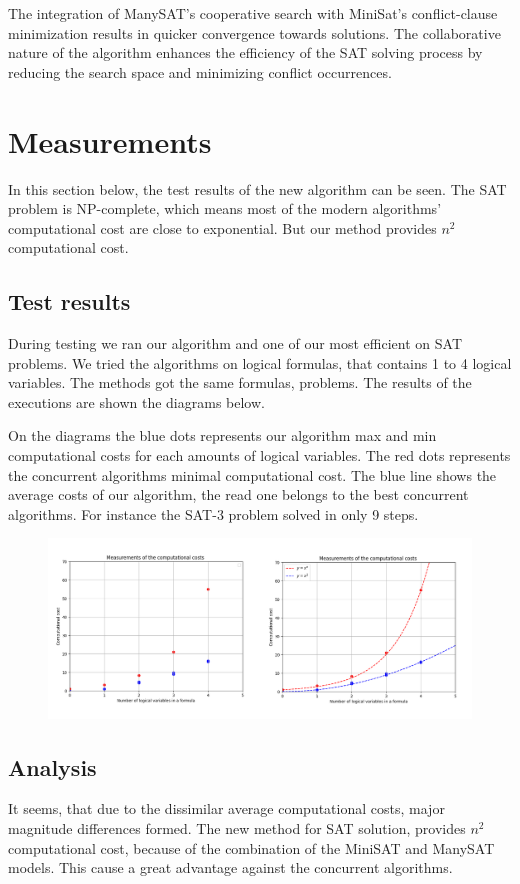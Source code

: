 \documentclass{article}
\begin{document}
The integration of ManySAT’s cooperative search with MiniSat’s conflict-clause minimization results in quicker convergence towards solutions. The collaborative nature of the algorithm enhances the efficiency of the SAT solving process by reducing the search space and minimizing conflict occurrences.

\section{Measurements}
In this section below, the test results of the new algorithm can be seen. The SAT problem is NP-complete, which means most of the modern algorithms' computational cost are close to exponential. But our method provides $n^{2}$ computational cost.

\subsection{Test results}
During testing we ran our algorithm and one of our most efficient on SAT problems. We tried the algorithms on logical formulas, that contains 1 to 4 logical variables. The methods got the same formulas, problems. The results of the executions are shown the diagrams below.

On the diagrams the blue dots represents our algorithm max and min computational costs for each amounts of logical variables. The red dots represents the concurrent algorithms minimal computational cost. The blue line shows the average costs of our algorithm, the read one belongs to the best concurrent algorithms. For instance the SAT-3 problem solved in only 9 steps.

\begin{figure}[h]
    \centering
    \includegraphics[width=1\linewidth]{img/measurements.png}
\end{figure}

\subsection{Analysis}
It seems, that due to the dissimilar average computational costs, major magnitude differences formed. The new method for SAT solution, provides $n^{2}$ computational cost, because of the combination of the MiniSAT and ManySAT models. This cause a great advantage against the concurrent algorithms.
\end{document}
